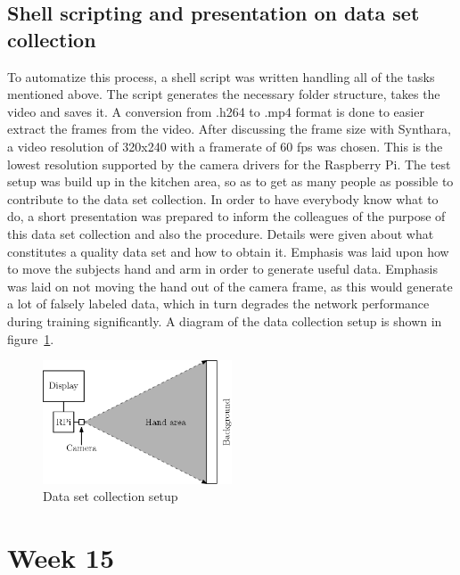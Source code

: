 \subsection{Shell scripting and presentation on data set collection}
To automatize this process, a shell script was written handling all of the tasks mentioned above. The script generates the necessary folder structure, takes the video and saves it. A conversion from .h264 to .mp4 format is done to easier extract the frames from the video. After discussing the frame size with Synthara, a video resolution of 320x240 with a framerate of 60 fps was chosen. This is the lowest resolution supported by the camera drivers for the Raspberry Pi.
The test setup was build up in the kitchen area, so as to get as many people as possible to contribute to the data set collection. In order to have everybody know what to do, a short presentation was prepared to inform the colleagues of the purpose of this data set collection and also the procedure. Details were given about what constitutes a quality data set and how to obtain it. Emphasis was laid upon how to move the subjects hand and arm in order to generate useful data. Emphasis was laid on not moving the hand out of the camera frame, as this would generate a lot of falsely labeled data, which in turn degrades the network performance during training significantly. A diagram of the data collection setup is shown in figure~\ref{fig:setup}.
\begin{figure}[!htb]
	\centering
		\includegraphics[width=0.5\textwidth]{bilder/collection_setup.png}
		\caption{Data set collection setup}
		\label{fig:setup}
\end{figure}

\section{Week 15}
